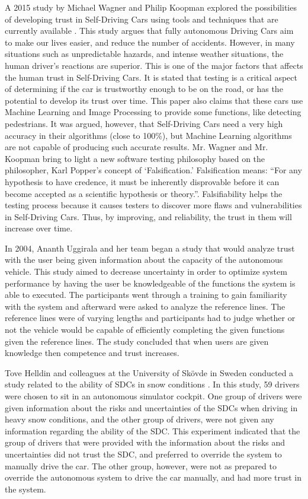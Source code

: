 \documentclass[runningheads,a4paper]{llncs}
\begin{document}
A 2015 study by Michael Wagner and Philip Koopman explored the possibilities of developing trust in Self-Driving Cars using tools and techniques that are currently available \cite{wagner2015philosophy}. This study argues that fully autonomous Driving Cars aim to make our lives easier, and reduce the number of accidents. However, in many situations such as unpredictable hazards, and intense weather situations, the human driver's reactions are superior. This is one of the major factors that affects the human trust in Self-Driving Cars. It is stated that testing is a critical aspect of determining if the car is trustworthy enough to be on the road, or has the potential to develop its trust over time. This paper also claims that these cars use Machine Learning and Image Processing to provide some functions, like detecting pedestrians. It was argued, however, that Self-Driving Cars need a very high accuracy in their algorithms (close to 100\%), but Machine Learning algorithms are not capable of producing such accurate results. Mr. Wagner and Mr. Koopman bring to light a new software testing philosophy based on the philosopher, Karl Popper's concept of `Falsification.' Falsification means: ``For any hypothesis to have credence, it must be inherently disprovable before it can become accepted as a scientific hypothesis or theory.''\cite{falsifiability}. Falsifiability helps the testing process because it causes testers to discover more flaws and vulnerabilities in Self-Driving Cars. Thus, by improving, and reliability, the trust in them will increase over time.

In 2004, Ananth Uggirala and her team began a study that would analyze trust with the user being given information about the capacity of the autonomous vehicle\cite{uggirala2004measurement}.  This study aimed to decrease uncertainty in order to optimize system performance by having the user be knowledgeable of the functions the system is able to executed.   The participants went through a training to gain familiarity with the system and afterward were asked to analyze the reference lines.  The reference lines were of varying lengths and participants had to judge whether or not the vehicle would be capable of efficiently completing the given functions given the reference lines.  The study concluded that when users are given knowledge then competence and trust increases.

Tove Helldin and colleagues at the University of Skövde in Sweden conducted a study related to the ability of SDCs in snow conditions \cite{helldin2013presenting}. In this study, 59 drivers were chosen to sit in an autonomous simulator cockpit. One group of drivers were given information about the risks and uncertainties of the SDCs when driving in heavy snow conditions, and the other group of drivers, were not given any information regarding the ability of the SDC. This experiment indicated that the group of drivers that were provided with the information about the risks and uncertainties did not trust the SDC, and preferred to override the system to manually drive the car. The other group, however, were not as prepared to override the autonomous system to drive the car manually, and had more trust in the system.
\end{document}
